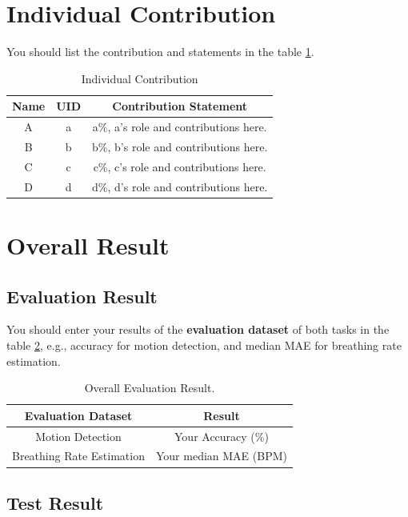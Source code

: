 \section{Individual Contribution}
You should list the contribution and statements in the table \ref{individual contribution}.

\begin{table}[!h]
\centering
\caption{Individual Contribution}
\label{individual contribution}
    \begin{tabular}{ccc}
    \toprule
    \textbf{Name} & \textbf{UID} & \textbf{Contribution Statement} \\
    \midrule
    A & a & a\%, a's role and contributions here. \\
    B & b & b\%, b's role and contributions here. \\
    C & c & c\%, c's role and contributions here. \\
    D & d & d\%, d's role and contributions here. \\
    \bottomrule
    \end{tabular}
\end{table}

\section{Overall Result}
\subsection{Evaluation Result}
You should enter your results of the \textbf{evaluation dataset} of both tasks in the table \ref{eval}, e.g., accuracy for motion detection, and median MAE for breathing rate estimation.

\begin{table}[!h]
\centering
\caption{Overall Evaluation Result.}
\label{eval}
    \begin{tabular}{cc}
    \toprule
    \textbf{Evaluation Dataset} & \textbf{Result} \\
    \midrule
    Motion Detection & Your Accuracy (\%) \\
    Breathing Rate Estimation & Your median MAE (BPM) \\
    \bottomrule
    \end{tabular}
\end{table}

\subsection{Test Result}

